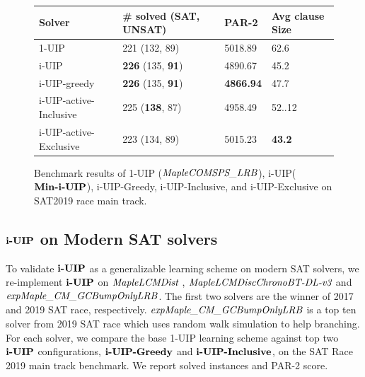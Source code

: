 \begin{figure} 
\begin{center}
\begin{tabular}{ | m{3.5cm} | m{4cm}| m{2cm} | m{2.75cm} |  } 
\hline
Solver & \# solved (SAT, UNSAT) & PAR-2 & Avg clause Size \\ 
\hline
1-UIP & 221 (132, 89)  & 5018.89 & 62.6  \\ 
\hline
i-UIP & \textbf{226} (135, \textbf{91}) & 4890.67 & 45.2 \\ 
\hline
i-UIP-greedy & \textbf{226} (135, \textbf{91})  & \textbf{4866.94} & 47.7 \\
\hline
i-UIP-active-Inclusive & 225 (\textbf{138}, 87) & 4958.49 & 52..12 \\
\hline
i-UIP-active-Exclusive & 223 (134, 89) & 5015.23 & \textbf{43.2} \\
\hline
\end{tabular}
\end{center}
\caption{Benchmark results of 1-UIP ($\textit{MapleCOMSPS\_LRB}$), i-UIP($\textbf{Min-i-UIP}$), i-UIP-Greedy,
i-UIP-Inclusive, and i-UIP-Exclusive on SAT2019 race main track.}
\label{fig:t4}
\end{figure}




\subsection{$\textbf{i-UIP}$ on Modern SAT solvers}
To validate $\textbf{i-UIP}$ as a generalizable learning scheme on modern SAT solvers, we re-implement $\textbf{i-UIP}$ on $\textit{MapleLCMDist}$ \cite{},  $\textit{MapleLCMDiscChronoBT-DL-v3}$ \cite{} and $\textit{expMaple\_CM\_GCBumpOnlyLRB}$.  
The first two solvers are the winner of 2017 and 2019 SAT race, respectively.  $\textit{expMaple\_CM\_GCBumpOnlyLRB}$ is a top ten solver from 2019 SAT race which uses random walk simulation to help branching. For each solver, we compare the base 1-UIP learning scheme against top two $\textbf{i-UIP}$ configurations, $\textbf{i-UIP-Greedy}$ and $\textbf{i-UIP-Inclusive}$, on the SAT Race 2019 main track benchmark. We report solved instances and PAR-2 score.


